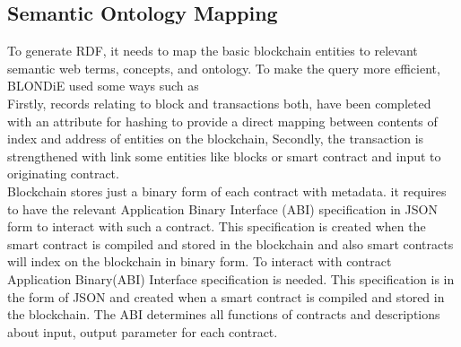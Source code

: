 \subsection{Semantic Ontology Mapping}
To generate RDF, it needs to map the basic blockchain entities to relevant semantic web terms, concepts, and ontology. To make the query more efficient, BLONDiE used some ways such as \\  
Firstly, records relating to block and transactions both, have been completed with an attribute for hashing to provide a direct mapping between contents of index and address of entities on the blockchain, Secondly, the transaction is strengthened with link some entities like blocks or smart contract and input to originating contract.\\
Blockchain stores just a binary form of each contract with metadata.   
it requires to have the relevant Application Binary Interface (ABI) specification in JSON form to interact with such a contract. This specification is created when the smart contract is compiled and stored in the blockchain and also smart contracts will index on the blockchain in binary form. To interact with contract Application Binary(ABI) Interface specification is needed. This specification is in the form of JSON and created when a smart contract is compiled and stored in the blockchain. The ABI determines all functions of contracts and descriptions about input, output parameter for each contract\cite{Third}.

